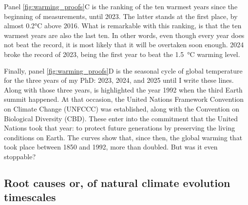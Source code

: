 Panel \ref{fig:warming_proofs}C is the ranking of the ten warmest years since the beginning of measurements, until 2023. The latter stands at the first place, by almost 0.2°C above 2016.
What is remarkable with this ranking, is that the ten warmest years are also the last ten. In other words, even though every year does not beat the record, it is most likely that it will be overtaken soon enough. 
2024 broke the record of 2023, being the first year to beat the \SI{1.5}{\degreeCelsius} warming level.

Finally, panel \ref{fig:warming_proofs}D is the seasonal cycle of global temperature for the three years of my PhD: 2023, 2024, and 2025 until I write these lines. Along with those three years, is highlighted the year 1992 when the third Earth summit happened. At that occasion, the United Nations Framework Convention on Climate Change (UNFCCC) was established, along with the Convention on Biological Diversity (CBD). These enter into the commitment that the United Nations took that year: to protect future generations by preserving the living conditions on Earth.
The curves show that, since then, the global warming that took place between 1850 and 1992, more than doubled.
But was it even stoppable? 

\subsection{Root causes or, of natural climate evolution timescales}
\label{sec:causes_of_GW}

